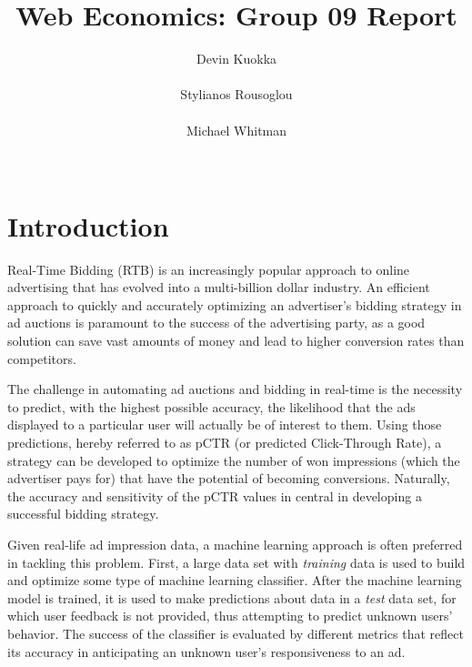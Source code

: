 \documentclass{sig-alternate-05-2015}
\begin{document}

\title{Web Economics: Group 09 Report}

\author{
\alignauthor
Devin Kuokka\\
       \\
\alignauthor
Stylianos Rousoglou\\
       \\
\alignauthor
Michael Whitman\\
       \\
}
\maketitle

\section{Introduction}
Real-Time Bidding (RTB) is an increasingly popular approach to online advertising that has evolved into a multi-billion dollar industry. An efficient approach to quickly and accurately optimizing an advertiser's bidding strategy in ad auctions is paramount to the success of the advertising party, as a good solution can save vast amounts of money and lead to higher conversion rates than competitors.

The challenge in automating ad auctions and bidding in real-time is the necessity to predict, with the highest possible accuracy, the likelihood that the ads displayed to a particular user will actually be of interest to them. Using those predictions, hereby referred to as pCTR (or predicted Click-Through Rate), a strategy can be developed to optimize the number of won impressions (which the advertiser pays for) that have the potential of becoming conversions. Naturally, the accuracy and sensitivity of the pCTR values in central in developing a successful bidding strategy.

Given real-life ad impression data, a machine learning approach is often preferred in tackling this problem. First, a large data set with \textit{training} data is used to build and optimize some type of machine learning classifier. After the machine learning model is trained, it is used to make predictions about data in a \textit{test} data set, for which user feedback is not provided, thus attempting to predict unknown users' behavior. The success of the classifier is evaluated by different metrics that reflect its accuracy in anticipating an unknown user's responsiveness to an ad.
\end{document}
